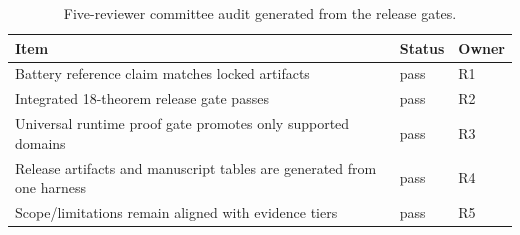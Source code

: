 \begin{table}[htbp]
\centering
\caption{Five-reviewer committee audit generated from the release gates.}
\label{tab:committee-audit-checklist}
\begin{tabular}{p{8.0cm}ll}
\toprule
Item & Status & Owner \\
\midrule
Battery reference claim matches locked artifacts & pass & R1 \\
Integrated 18-theorem release gate passes & pass & R2 \\
Universal runtime proof gate promotes only supported domains & pass & R3 \\
Release artifacts and manuscript tables are generated from one harness & pass & R4 \\
Scope/limitations remain aligned with evidence tiers & pass & R5 \\
\bottomrule
\end{tabular}
\end{table}
